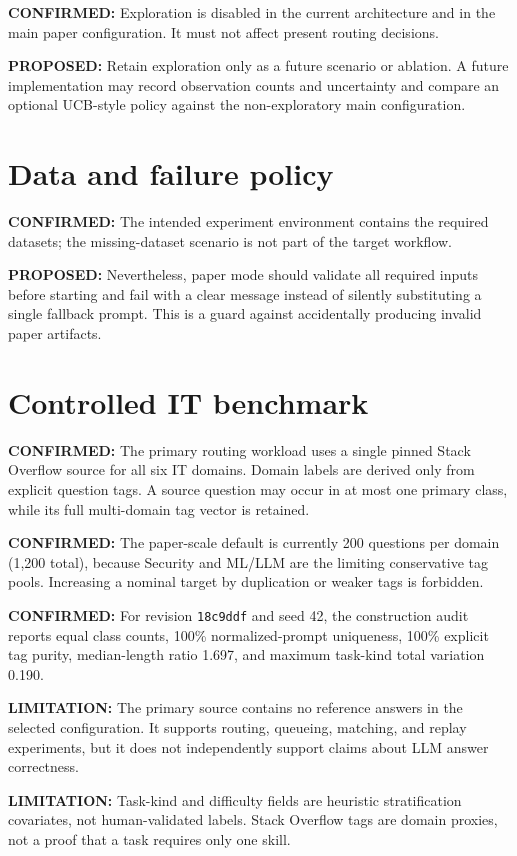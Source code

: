 \documentclass[11pt]{article}
\newcommand{\Confirmed}[1]{\par\noindent\textcolor{confirmed}{\textbf{CONFIRMED:} #1}\par}
\newcommand{\Proposal}[1]{\par\noindent\textcolor{proposal}{\textbf{PROPOSED:} #1}\par}
\newcommand{\Warning}[1]{\par\noindent\textcolor{warning}{\textbf{LIMITATION:} #1}\par}
\begin{document}
\Confirmed{Exploration is disabled in the current architecture and in the main
paper configuration. It must not affect present routing decisions.}

\Proposal{Retain exploration only as a future scenario or ablation. A future
implementation may record observation counts and uncertainty and compare an
optional UCB-style policy against the non-exploratory main configuration.}

\section{Data and failure policy}

\Confirmed{The intended experiment environment contains the required datasets;
the missing-dataset scenario is not part of the target workflow.}

\Proposal{Nevertheless, paper mode should validate all required inputs before
starting and fail with a clear message instead of silently substituting a
single fallback prompt. This is a guard against accidentally producing invalid
paper artifacts.}

\section{Controlled IT benchmark}

\Confirmed{The primary routing workload uses a single pinned Stack Overflow
source for all six IT domains.  Domain labels are derived only from explicit
question tags.  A source question may occur in at most one primary class, while
its full multi-domain tag vector is retained.}

\Confirmed{The paper-scale default is currently 200 questions per domain
(1,200 total), because Security and ML/LLM are the limiting conservative tag
pools.  Increasing a nominal target by duplication or weaker tags is forbidden.}

\Confirmed{For revision \texttt{18c9ddf} and seed 42, the construction audit
reports equal class counts, 100\% normalized-prompt uniqueness, 100\% explicit
tag purity, median-length ratio 1.697, and maximum task-kind total variation
0.190.}

\Warning{The primary source contains no reference answers in the selected
configuration.  It supports routing, queueing, matching, and replay experiments,
but it does not independently support claims about LLM answer correctness.}

\Warning{Task-kind and difficulty fields are heuristic stratification
covariates, not human-validated labels.  Stack Overflow tags are domain proxies,
not a proof that a task requires only one skill.}
\end{document}

